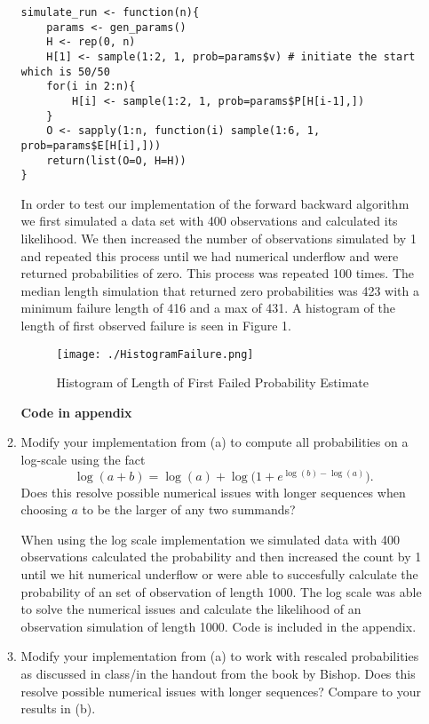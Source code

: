 \documentclass{article} %
\begin{document}
\begin{enumerate}
\begin{enumerate}
\begin{verbatim}
simulate_run <- function(n){
    params <- gen_params()
    H <- rep(0, n)
    H[1] <- sample(1:2, 1, prob=params$v) # initiate the start which is 50/50
    for(i in 2:n){
        H[i] <- sample(1:2, 1, prob=params$P[H[i-1],])
    }
    O <- sapply(1:n, function(i) sample(1:6, 1, prob=params$E[H[i],]))
    return(list(O=O, H=H))
}
\end{verbatim}

In order to test our implementation of the forward backward algorithm we first
simulated a data set with 400 observations and calculated its likelihood. We
then increased the number of observations simulated by 1 and repeated this
process until we had numerical underflow and were returned probabilities of
zero. This process was repeated 100 times. The median length simulation that
returned zero probabilities was 423 with a minimum failure length of 416 and a
max of 431. A histogram of the length of first observed failure is seen in
Figure 1.

\begin{figure}
  \caption{Histogram of Length of First Failed Probability Estimate}
  \centering
    \texttt{[image: ./HistogramFailure.png]}
\end{figure}

\textbf{Code in appendix}

  \item Modify your implementation from (a) to compute all
    probabilities on a log-scale using the fact
    \[
    \log(a+b) = \log(a) + \log\big(1+e^{\log(b)-\log(a)}\big).
    \]
    Does this resolve possible numerical issues with longer sequences
    when choosing $a$ to be the larger of any two summands?

When using the log scale implementation we simulated data with 400 observations
calculated the probability and then increased the count by 1 until we hit
numerical underflow or were able to succesfully calculate the probability
of an set of observation of length 1000. The log scale was able to solve the
numerical issues and calculate the likelihood of an observation simulation of
length 1000. Code is included in the appendix.

  \item Modify your implementation from (a) to work with rescaled
    probabilities as discussed in class/in the handout from the book
    by Bishop.  Does this resolve possible numerical issues with
    longer sequences?  Compare to your results in (b).
  \end{enumerate}


\end{enumerate}
\end{document}
